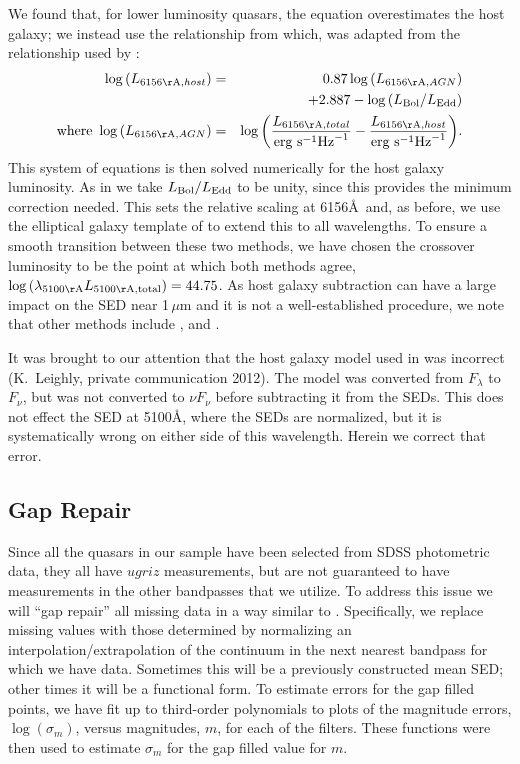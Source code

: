 We found that, for lower luminosity quasars, the \citet{Shen:2011} equation overestimates the host galaxy; we instead use the relationship from \citet{Richards:2006} which, was adapted from the relationship used by \citet{Vanden-Berk:2006}:
\footnotesize
\begin{eqnarray}
\log{(L_{6156{\rm \AA},host})} &=& 0.87 \log{(L_{6156{\rm \AA},AGN})} \nonumber \\
	&& + 2.887 - \log{(L_{{\rm Bol}}/L_{{\rm Edd}})} \\
\mbox{where } \log{(L_{6156{\rm \AA},AGN})} &=& \log{\left( \frac{L_{6156{\rm \AA},total}}{\mbox{erg s}^{-1} \mbox{Hz}^{-1}} - \frac{L_{6156{\rm \AA},host}}{\mbox{erg s}^{-1} \mbox{Hz}^{-1}} \right)}. \nonumber
\end{eqnarray}
\normalsize
This system of equations is then solved numerically for the host galaxy luminosity.  As in \citet{Richards:2006} we take $L_{{\rm Bol}}/L_{{\rm Edd}}$ to be unity, since this provides the minimum correction needed.  This sets the relative scaling at 6156\AA\, and, as before, we use the elliptical galaxy template of \citet{Fioc:1997} to extend this to all wavelengths.  To ensure a smooth transition between these two methods, we have chosen the crossover luminosity to be the point at which both methods agree, $\log{(\lambda_{5100{\rm \AA}} L_{5100{\rm \AA},{\rm total}})}=44.75$.
As host galaxy subtraction can have a large impact on the SED near 1\,$\mu$m and it is not a well-established procedure, we note that
other methods include \citet{Croom:2002}, and \citet{Maddox:2006}.

It was brought to our attention that the host galaxy model used in \citet{Richards:2006} was incorrect (K.\ Leighly, private communication 2012).  The model was converted from $F_{\lambda}$ to $F_{\nu}$, but was not converted to $\nu F_{\nu}$ before subtracting it from the SEDs.  This does not effect the SED at 5100\AA, where the SEDs are normalized, but it is systematically wrong on either side of this wavelength.   Herein we correct that error.

\subsection{Gap Repair}

Since all the quasars in our sample have been selected from SDSS photometric data, they all have $ugriz$ measurements, but are not guaranteed to have measurements in the other bandpasses that we utilize. To address this issue we will ``gap repair'' all missing data in a way similar to \citet{Richards:2006}.  Specifically, we replace missing values with those determined by normalizing an interpolation/extrapolation of the continuum in the next nearest bandpass for which we have data.   Sometimes this will be a previously constructed mean SED; other times it will be a functional form.
To estimate errors for the gap filled points, we have fit up to third-order polynomials to plots of the magnitude errors, $\log(\sigma_m)$, versus magnitudes, $m$, for each of the filters.  These functions were then used to estimate $\sigma_m$ for the gap filled value for $m$.


